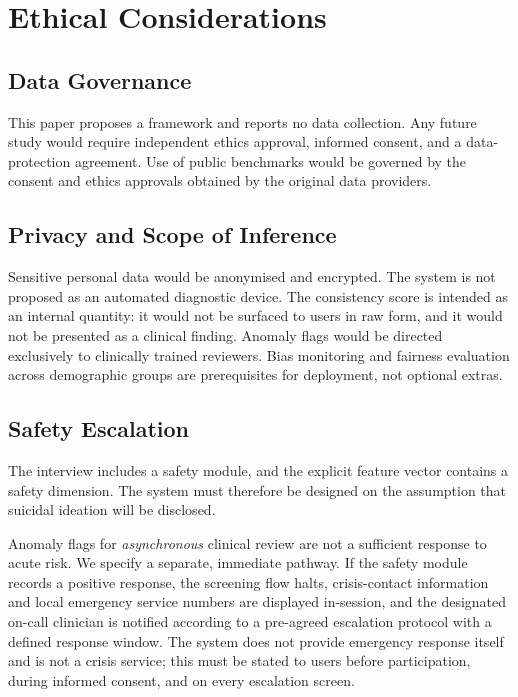 \documentclass[12pt]{article}
\begin{document}
\section{Ethical Considerations}

\subsection{Data Governance}

This paper proposes a framework and reports no data collection. Any
future study would require independent ethics approval, informed
consent, and a data-protection agreement. Use of public benchmarks
would be governed by the consent and ethics approvals obtained by the
original data providers.

\subsection{Privacy and Scope of Inference}

Sensitive personal data would be anonymised and encrypted. The system
is not proposed as an automated diagnostic device. The consistency
score is intended as an internal quantity: it would not be surfaced to
users in raw form, and it would not be presented as a clinical finding.
Anomaly flags would be directed exclusively to clinically trained
reviewers. Bias monitoring and fairness evaluation across demographic
groups are prerequisites for deployment, not optional extras.

\subsection{Safety Escalation}
\label{sec:safety}

The interview includes a safety module, and the explicit feature vector
contains a safety dimension. The system must therefore be designed on
the assumption that suicidal ideation will be disclosed.

Anomaly flags for \emph{asynchronous} clinical review are not a
sufficient response to acute risk. We specify a separate, immediate
pathway. If the safety module records a positive response, the
screening flow halts, crisis-contact information and local emergency
service numbers are displayed in-session, and the designated on-call
clinician is notified according to a pre-agreed escalation protocol
with a defined response window. The system does not provide emergency
response itself and is not a crisis service; this must be stated to
users before participation, during informed consent, and on every
escalation screen.
\end{document}
